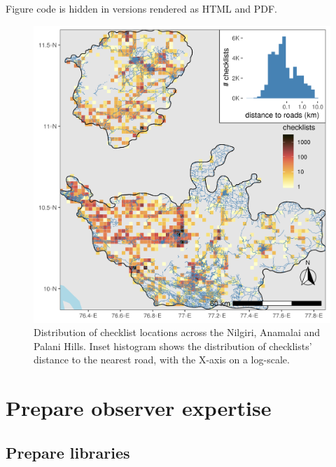 \documentclass[]{article}
\begin{document}
Figure code is hidden in versions rendered as HTML and PDF.

\begin{figure}
\centering
\includegraphics{figs/fig_03_distance_to_roads.png}
\caption{Distribution of checklist locations across the Nilgiri, Anamalai and Palani Hills. Inset histogram shows the distribution of checklists' distance to the nearest road, with the X-axis on a log-scale.}
\end{figure}

\hypertarget{prepare-observer-expertise}{%
\section{Prepare observer expertise}\label{prepare-observer-expertise}}

\hypertarget{prepare-libraries-2}{%
\subsection{Prepare libraries}\label{prepare-libraries-2}}
\end{document}
